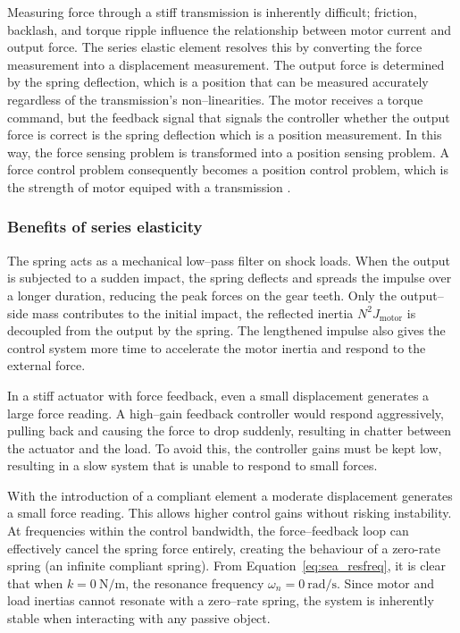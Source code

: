 \documentclass[11pt,a4paper,twoside,openright]{book}
\begin{document}
Measuring force through a stiff transmission is inherently difficult; friction, backlash, and torque ripple influence the relationship between motor current and output force. The series elastic element resolves this by converting the force measurement into a displacement measurement. The output force is determined by the spring deflection, which is a position that can be measured accurately regardless of the transmission's non--linearities. The motor receives a torque command, but the feedback signal that signals the controller whether the output force is correct is the spring deflection which is a position measurement. In this way, the force sensing problem is transformed into a position sensing problem. A force control problem consequently becomes a position control problem, which is the strength of motor equiped with a transmission \cite{prattSeriesElasticActuators1995, prattSeriesElasticActuators2002, huResearchVariableImpedance2025b, yuLearningElasticitySeriesElastic2017,hurst}.

\subsubsection{Benefits of series elasticity}
 
The spring acts as a mechanical low--pass filter on shock loads. When the output is subjected to a sudden impact, the spring deflects and spreads the impulse over a longer duration, reducing the peak forces on the gear teeth. Only the output--side mass contributes to the initial impact, the reflected inertia $N^2 J_{\text{motor}}$ is decoupled from the output by the spring. The lengthened impulse also gives the control system more time to accelerate the motor inertia and respond to the external force.

In a stiff actuator with force feedback, even a small displacement generates a large force reading. A high--gain feedback controller would respond aggressively, pulling back and causing the force to drop suddenly, resulting in chatter between the actuator and the load. To avoid this, the controller gains must be kept low, resulting in a slow system that is unable to respond to small forces.

With the introduction of a compliant element a moderate displacement generates a small force reading. This allows higher control gains without risking instability. At frequencies within the control bandwidth, the force--feedback loop can effectively cancel the spring force entirely, creating the behaviour of a zero-rate spring (an infinite compliant spring). From Equation~\eqref{eq:sea_resfreq}, it is clear that when $k = \SI{0}{\newton\per\metre}$, the resonance frequency $\omega_n = \SI{0}{\radian\per\second}$. Since motor and load inertias cannot resonate with a zero--rate spring, the system is inherently stable when interacting with any passive object.
\end{document}
